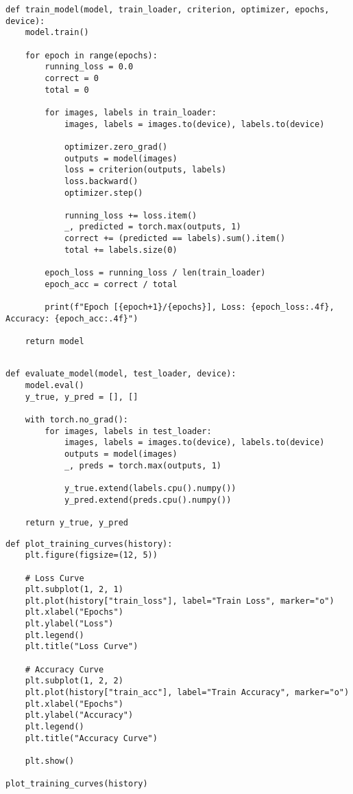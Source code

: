 \begin{verbatim}
def train_model(model, train_loader, criterion, optimizer, epochs, device):
    model.train()

    for epoch in range(epochs):
        running_loss = 0.0
        correct = 0
        total = 0

        for images, labels in train_loader:
            images, labels = images.to(device), labels.to(device)

            optimizer.zero_grad()
            outputs = model(images)
            loss = criterion(outputs, labels)
            loss.backward()
            optimizer.step()

            running_loss += loss.item()
            _, predicted = torch.max(outputs, 1)
            correct += (predicted == labels).sum().item()
            total += labels.size(0)

        epoch_loss = running_loss / len(train_loader)
        epoch_acc = correct / total

        print(f"Epoch [{epoch+1}/{epochs}], Loss: {epoch_loss:.4f}, Accuracy: {epoch_acc:.4f}")

    return model


\end{verbatim}

\begin{verbatim}
def evaluate_model(model, test_loader, device):
    model.eval()
    y_true, y_pred = [], []

    with torch.no_grad():
        for images, labels in test_loader:
            images, labels = images.to(device), labels.to(device)
            outputs = model(images)
            _, preds = torch.max(outputs, 1)

            y_true.extend(labels.cpu().numpy())
            y_pred.extend(preds.cpu().numpy())

    return y_true, y_pred

\end{verbatim}

\begin{verbatim}
def plot_training_curves(history):
    plt.figure(figsize=(12, 5))

    # Loss Curve
    plt.subplot(1, 2, 1)
    plt.plot(history["train_loss"], label="Train Loss", marker="o")
    plt.xlabel("Epochs")
    plt.ylabel("Loss")
    plt.legend()
    plt.title("Loss Curve")

    # Accuracy Curve
    plt.subplot(1, 2, 2)
    plt.plot(history["train_acc"], label="Train Accuracy", marker="o")
    plt.xlabel("Epochs")
    plt.ylabel("Accuracy")
    plt.legend()
    plt.title("Accuracy Curve")

    plt.show()

plot_training_curves(history)

\end{verbatim}

